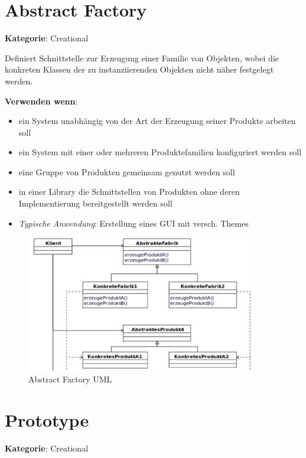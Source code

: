 
\section{Abstract Factory}
\textbf{Kategorie}: Creational

Definiert Schnittstelle zur Erzeugung einer Familie von Objekten, wobei die konkreten Klassen der zu instanziierenden Objekten nicht näher festgelegt werden.

\textbf{Verwenden wenn}:

\begin{itemize}
	\item ein System unabhängig von der Art der Erzeugung seiner Produkte arbeiten soll
	\item ein System mit einer oder mehreren Produktefamilien konfiguriert werden soll
	\item eine Gruppe von Produkten gemeinsam genutzt werden soll
	\item in einer Library die Schnittstellen von Produkten ohne deren Implementierung bereitgestellt werden soll
\end{itemize}

\begin{itemize}
	\item \textit{Typische Anwendung}: Erstellung eines GUI mit versch. Themes
\end{itemize}

\begin{figure}[H]
	\centering
	\includegraphics[width=0.9\textwidth]{content/gof/images/01-abstract-factory-uml.png}
	\caption{Abstract Factory UML}
\end{figure}


\section{Prototype}
\textbf{Kategorie}: Creational

